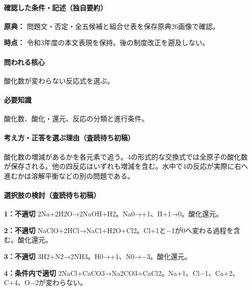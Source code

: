 \paragraph{確認した条件・記述（独自要約）}\mbox{}\par

\noindent\textbf{原典：} 問題文・否定・全五候補と組合せ表を保存原典26画像で確認。\par

\noindent\textbf{時点：} 令和3年度の本文表現を保持。後の制度改正を遡及しない。\par

\paragraph{問われる核心} 酸化数が変わらない反応式を選ぶ。

\paragraph{必要知識} 酸化数、酸化・還元、反応の分類と進行条件。

\paragraph{考え方・正答を選ぶ理由（査読待ち初稿）} 酸化数の増減があるかを各元素で追う。4の形式的な交換式では全原子の酸化数が保存される。他の四反応はいずれも増減を含む。水中で4の反応が実際に右へ進むかは溶解平衡などの別の問題である。

\paragraph{選択肢の検討（査読待ち初稿）}\mbox{}\par

\noindent\textbf{1：不適切} 2Na+2H2O→2NaOH+H2。Na0→+1、H+1→0。酸化還元。\par

\noindent\textbf{2：不適切} NaClO+2HCl→NaCl+H2O+Cl2。Cl+1と−1が0へ変わる過程を含む。酸化還元。\par

\noindent\textbf{3：不適切} 3H2+N2→2NH3。H0→+1、N0→−3。酸化還元。\par

\noindent\textbf{4：条件内で適切} 2NaCl+CaCO3→Na2CO3+CaCl2。Na+1、Cl−1、Ca+2、C+4、O−2が変わらない。\par

